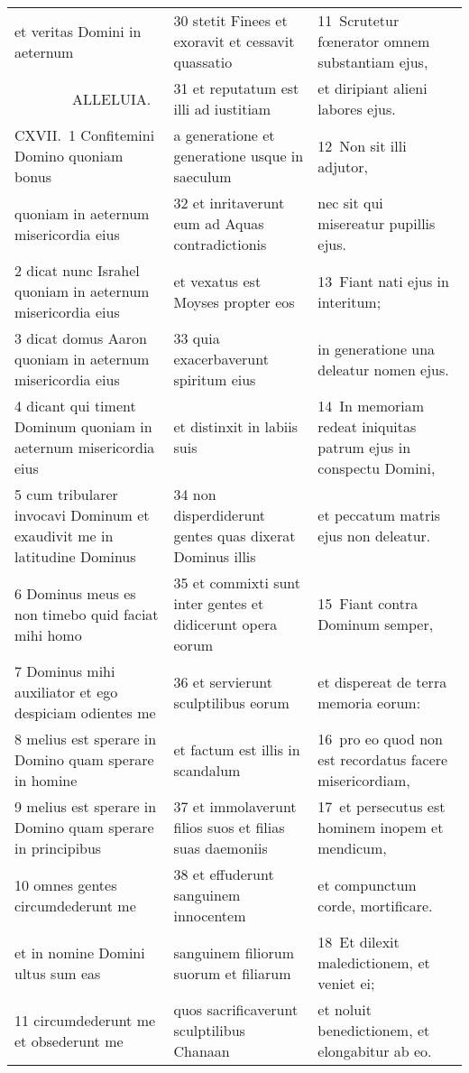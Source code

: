 \documentclass{article}
\begin{document}
\begin{longtable}{@{}p{}p{}p{}@{}}
et veritas Domini in aeternum	&	30 stetit Finees et exoravit et cessavit quassatio	&	11 Scrutetur fœnerator omnem substantiam ejus,	\\
    ALLELUIA.	&	31 et reputatum est illi ad iustitiam	&	et diripiant alieni labores ejus.	\\
CXVII. 1 Confitemini Domino quoniam bonus	&	a generatione et generatione usque in saeculum	&	12 Non sit illi adjutor,	\\
quoniam in aeternum misericordia eius	&	32 et inritaverunt eum ad Aquas contradictionis	&	nec sit qui misereatur pupillis ejus.	\\
2 dicat nunc Israhel quoniam in aeternum misericordia eius	&	et vexatus est Moyses propter eos	&	13 Fiant nati ejus in interitum;	\\
3 dicat domus Aaron quoniam in aeternum misericordia eius	&	33 quia exacerbaverunt spiritum eius	&	in generatione una deleatur nomen ejus.	\\
4 dicant qui timent Dominum quoniam in aeternum misericordia eius	&	et distinxit in labiis suis	&	14 In memoriam redeat iniquitas patrum ejus in conspectu Domini,	\\
5 cum tribularer invocavi Dominum et exaudivit me in latitudine Dominus	&	34 non disperdiderunt gentes quas dixerat Dominus illis	&	et peccatum matris ejus non deleatur.	\\
6 Dominus meus es non timebo quid faciat mihi homo	&	35 et commixti sunt inter gentes et didicerunt opera eorum	&	15 Fiant contra Dominum semper,	\\
7 Dominus mihi auxiliator et ego despiciam odientes me	&	36 et servierunt sculptilibus eorum	&	et dispereat de terra memoria eorum:	\\
8 melius est sperare in Domino quam sperare in homine	&	et factum est illis in scandalum	&	16 pro eo quod non est recordatus facere misericordiam,	\\
9 melius est sperare in Domino quam sperare in principibus	&	37 et immolaverunt filios suos et filias suas daemoniis	&	17 et persecutus est hominem inopem et mendicum,	\\
10 omnes gentes circumdederunt me	&	38 et effuderunt sanguinem innocentem	&	et compunctum corde, mortificare.	\\
et in nomine Domini ultus sum eas	&	sanguinem filiorum suorum et filiarum	&	18 Et dilexit maledictionem, et veniet ei;	\\
11 circumdederunt me et obsederunt me	&	quos sacrificaverunt sculptilibus Chanaan	&	et noluit benedictionem, et elongabitur ab eo.	\\

\end{longtable}
\end{document}
